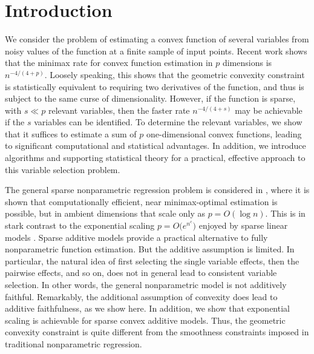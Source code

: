 \section{Introduction}


We consider the problem of estimating a convex function of several
variables from noisy values of the function at a finite sample of
input points.  Recent work \cite{Guntu:12,Guntu:13} shows that the
minimax rate for convex function estimation in $p$ dimensions is
$n^{-4/(4+p)}$.  Loosely speaking, this shows that the
geometric convexity constraint is statistically equivalent to
requiring two derivatives of the function, and thus is
subject to the same curse of dimensionality.
However, if the function is sparse, with $s\ll p$ relevant variables,
then the faster rate $n^{-4/(4+s)}$ may be achievable if the $s$
variables can be identified.  To determine the relevant variables, we
show that it suffices to estimate a sum of $p$ one-dimensional convex
functions, leading to significant computational and statistical
advantages.  In addition, we introduce algorithms and supporting
statistical theory for a practical, effective approach to this
variable selection problem.


The general sparse nonparametric regression problem is considered in
\cite{lafferty2008rodeo}, where it is shown that computationally
efficient, near minimax-optimal estimation is possible, but in ambient
dimensions that scale only as $p = O(\log n)$.  This is in stark
contrast to the exponential scaling $p = O\bigl(e^{n^c}\bigr)$ enjoyed
by sparse linear models \cite{Wain:09a}.  Sparse additive models
\cite{Ravikumar:09} provide a practical alternative to fully
nonparametric function estimation.  But the additive assumption is
limited.  In particular, the natural idea of first selecting the
single variable effects, then the pairwise effects, and so on, does
not in general lead to consistent variable selection.  In other words,
the general nonparametric model is not additively faithful.
Remarkably, the additional assumption of convexity does lead to
additive faithfulness, as we show here.  In addition, we show that
exponential scaling is achievable for sparse convex additive models.
Thus, the geometric convexity constraint is quite different from the
smoothness constraints imposed in traditional nonparametric
regression.

